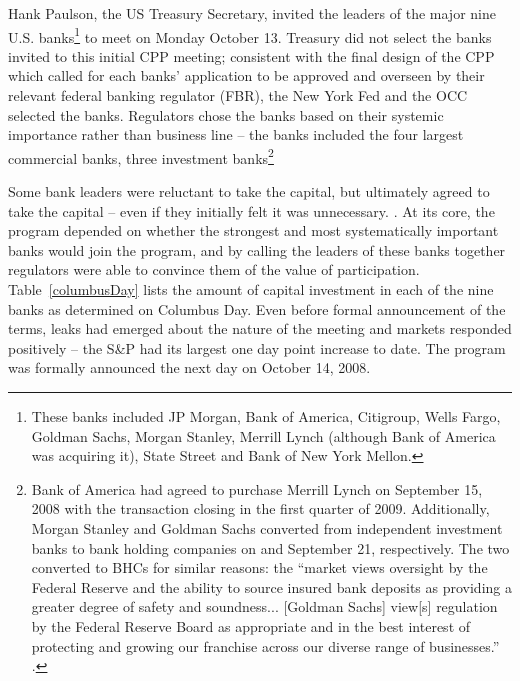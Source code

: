 \documentclass[12pt]{article}
\begin{document}
Hank Paulson, the US Treasury Secretary, invited the leaders of the major nine U.S. banks\footnote{These banks included JP Morgan, Bank of America, Citigroup, Wells Fargo, Goldman Sachs, Morgan Stanley, Merrill Lynch (although Bank of America was acquiring it), State Street and Bank of New York Mellon.} to meet on Monday October 13. Treasury did not select the banks invited to this initial CPP meeting; consistent with the final design of the CPP which called for each banks' application to be approved and overseen by their relevant federal banking regulator (FBR), the New York Fed and the OCC selected the banks. Regulators chose the banks based on their systemic importance rather than business line -- the banks included the four largest commercial banks, three investment banks\footnote{Bank of America had  agreed to purchase Merrill Lynch on September 15, 2008 with the transaction closing in the first quarter of 2009. Additionally, Morgan Stanley and Goldman Sachs converted from independent investment banks to bank holding companies on and September 21, respectively. The two converted to BHCs for similar reasons: the ``market views oversight by the Federal Reserve and the ability to source insured bank deposits as providing a greater degree of safety and soundness... [Goldman Sachs] view[s] regulation by the Federal Reserve Board as appropriate and in the best interest of protecting and growing our franchise across our diverse range of businesses.'' \citep{GSBHC}.}

Some bank leaders were reluctant to take the capital, but ultimately agreed to take the capital -- even if they initially felt it was unnecessary. \citep{Geithner}. At its core, the program depended on whether the strongest and most systematically important banks would join the program, and by calling the leaders of these banks together regulators were able to convince them of the value of participation. Table~\ref{columbusDay} lists the amount of capital investment in each of the nine banks as determined on Columbus Day. Even before formal announcement of the terms, leaks had emerged about the nature of the meeting and markets responded positively -- the S\&P had its largest one day point increase to date. The program was formally announced the next day on October 14, 2008.
\end{document}
